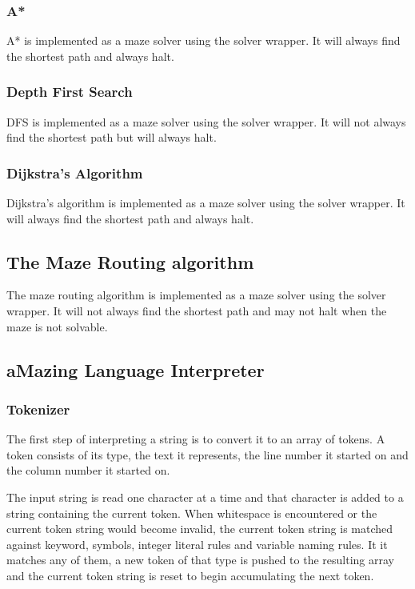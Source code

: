 \subsubsection{A*}

A* is implemented as a maze solver using the solver wrapper. It will always find the shortest path and always halt.

\subsubsection{Depth First Search}

DFS is implemented as a maze solver using the solver wrapper. It will not always find the shortest path but will always halt.

\subsubsection{Dijkstra's Algorithm}

Dijkstra's algorithm is implemented as a maze solver using the solver wrapper. It will always find the shortest path and always halt.

\subsection{The Maze Routing algorithm}

The maze routing algorithm is implemented as a maze solver using the solver wrapper. It will not always find the shortest path and may not halt when the maze is not solvable.

\subsection{aMazing Language Interpreter}

\subsubsection{Tokenizer}

The first step of interpreting a string is to convert it to an array of tokens. A token consists of its type, the text it represents, the line number it started on and the column number it started on.

The input string is read one character at a time and that character is added to a string containing the current token. When whitespace is encountered or the current token string would become invalid, the current token string is matched against keyword, symbols, integer literal rules and variable naming rules. It it matches any of them, a new token of that type is pushed to the resulting array and the current token string is reset to begin accumulating the next token.

